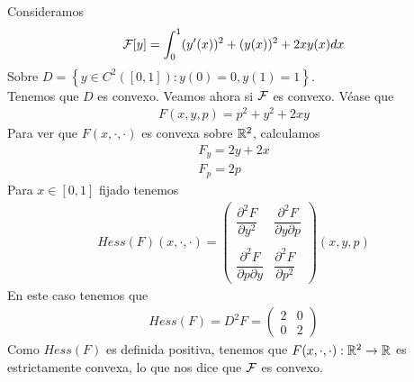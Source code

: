 \begin{ejemplo}
    Consideramos 
    \begin{gather*}
        \mathcal{F}[y] = \int_{0}^{1} (y'(x))^2 + (y(x))^2 + 2xy(x) dx
    \end{gather*}
    Sobre $D = \left\{ y\in C^2([0,1]) : y(0) = 0, y(1) = 1 \right\}$.\\

    Tenemos que $D$ es convexo. Veamos ahora si $\mathcal{F}$ es convexo. Véase que 
    \begin{gather*}
        F(x,y,p) = p^2 + y^2 + 2xy
    \end{gather*}
    Para ver que $F(x,\cdot, \cdot)$ es convexa sobre $\mathbb{R}^2$, calculamos
    \begin{gather*}
        F_y = 2y+2x\\
        F_p = 2p
    \end{gather*}
    Para $x\in [0,1]$ fijado tenemos 
    \begin{gather*}
        Hess(F)(x,\cdot,\cdot) = 
        \begin{pmatrix}
            \dfrac{\partial^2F}{\partial y^2} & \dfrac{\partial^2F}{\partial y \partial p}\\\\
            \dfrac{\partial^2F}{\partial p\partial y} & \dfrac{\partial^2F}{\partial p^2}
        \end{pmatrix}(x,y,p)
    \end{gather*}
    En este caso tenemos que 
    \begin{gather*}
        Hess(F) = D^2 F = \begin{pmatrix}
            2 & 0 \\ 
            0 & 2
        \end{pmatrix}
    \end{gather*}
    Como $Hess(F)$ es definida positiva, tenemos que $F(x,\cdot,\cdot):\mathbb{R}^2 \to \mathbb{R}$ es estrictamente convexa, lo que nos dice que $\mathcal{F}$ es convexo. \\


\end{ejemplo}
